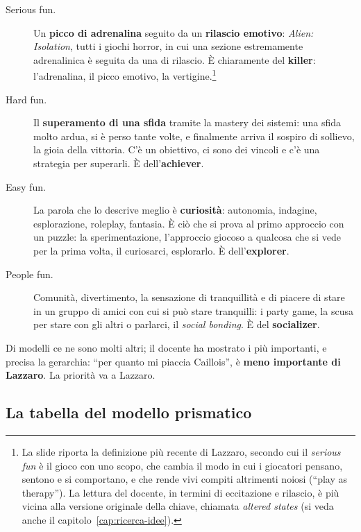 \begin{description}
  \item[Serious fun.] Un \textbf{picco di adrenalina} seguito da un \textbf{rilascio
        emotivo}: \emph{Alien: Isolation}, tutti i giochi horror, in cui una sezione
        estremamente adrenalinica è seguita da una di rilascio. È chiaramente del
        \textbf{killer}: l'adrenalina, il picco emotivo, la vertigine.\footnote{La
        slide riporta la definizione più recente di Lazzaro, secondo cui il
        \emph{serious fun} è il gioco con uno scopo, che cambia il modo in cui i
        giocatori pensano, sentono e si comportano, e che rende vivi compiti
        altrimenti noiosi (``play as therapy''). La lettura del docente, in termini di
        eccitazione e rilascio, è più vicina alla versione originale della chiave,
        chiamata \emph{altered states} (si veda anche il
        capitolo~\ref{cap:ricerca-idee}).}
  \item[Hard fun.] Il \textbf{superamento di una sfida} tramite la mastery dei
        sistemi: una sfida molto ardua, si è perso tante volte, e finalmente arriva
        il sospiro di sollievo, la gioia della vittoria. C'è un obiettivo, ci sono dei
        vincoli e c'è una strategia per superarli. È dell'\textbf{achiever}.
  \item[Easy fun.] La parola che lo descrive meglio è \textbf{curiosità}: autonomia,
        indagine, esplorazione, roleplay, fantasia. È ciò che si prova al primo
        approccio con un puzzle: la sperimentazione, l'approccio giocoso a qualcosa
        che si vede per la prima volta, il curiosarci, esplorarlo. È
        dell'\textbf{explorer}.
  \item[People fun.] Comunità, divertimento, la sensazione di tranquillità e di
        piacere di stare in un gruppo di amici con cui si può stare tranquilli: i
        party game, la scusa per stare con gli altri o parlarci, il \emph{social
        bonding}. È del \textbf{socializer}.
\end{description}

Di modelli ce ne sono molti altri; il docente ha mostrato i più importanti, e
precisa la gerarchia: ``per quanto mi piaccia Caillois'', è \textbf{meno importante
di Lazzaro}. La priorità va a Lazzaro.


\subsection{La tabella del modello prismatico}

